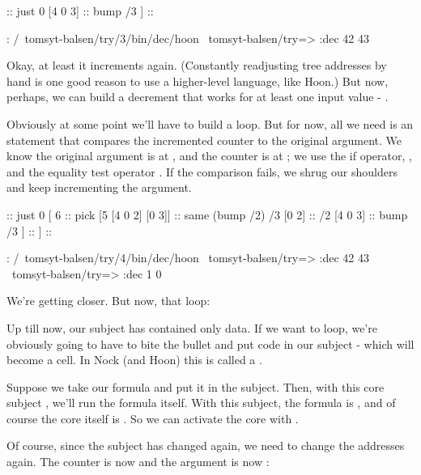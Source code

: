 \begin{code}
[ 8                                          ::  push
  [1 0]                                      ::  just 0
  [4 0 3]                                    ::  bump /3
]                                            ::

: /~tomsyt-balsen/try/3/bin/dec/hoon
~tomsyt-balsen/try=> :dec 42
43
\end{code}
Okay, at least it increments again.  (Constantly readjusting tree
addresses by hand is one good reason to use a higher-level
language, like Hoon.) But now, perhaps, we can build a decrement
that works for at least one input value - .

Obviously at some point we'll have to build a loop.  But for now,
all we need is an  statement that compares the incremented
counter to the original argument.  We know the original argument
is at , and the counter is at ; we use the if operator,
, and the equality test operator .  If the comparison
fails, we shrug our shoulders and keep incrementing the argument.

\begin{code}
[ 8                                          ::  push
  [1 0]                                      ::  just 0
  [ 6                                        ::  pick
    [5 [4 0 2] [0 3]]                        ::  same (bump /2) /3
    [0 2]                                    ::  /2
    [4 0 3]                                  ::  bump /3
  ]                                          :: 
]                                            :: 

: /~tomsyt-balsen/try/4/bin/dec/hoon
~tomsyt-balsen/try=> :dec 42
43
~tomsyt-balsen/try=> :dec 1
0
\end{code}
We're getting closer.  But now, that loop:

Up till now, our subject has contained only data.  If we want to
loop, we're obviously going to have to bite the bullet and put
code in our subject - which will become a  cell.
In Nock (and Hoon) this is called a .

Suppose we take our  formula and put it in the subject.  Then,
with this core subject , we'll run
the formula itself.  With this subject, the formula is , and
of course the core itself is .  So we can activate the core
with \kode{[2 [0 1] [0 2]]}.

Of course, since the subject has changed again, we need to change
the addresses again.  The counter is now  and the argument
is now :

